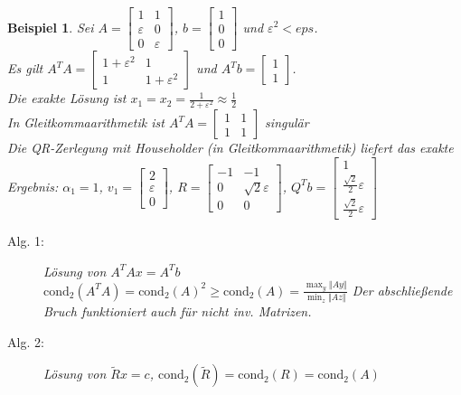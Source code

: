 \documentclass[12pt]{article}
\theoremstyle{break}
\newtheorem{example}[theorem]{Beispiel}
\begin{document}
\begin{example}
Sei $A = \left[ \begin{matrix} 1 & 1 \\ \varepsilon & 0 \\ 0 & \varepsilon \end{matrix} \right]$, $b= \left[ \begin{matrix} 1 \\ 0 \\ 0 \end{matrix} \right]$ und $\varepsilon^2 < eps$.\\
Es gilt $A^TA = \left[ \begin{matrix} 1+ \varepsilon^2 & 1 \\ 1 & 1 + \varepsilon^2 \end{matrix} \right]$ und $A^Tb = \left[ \begin{matrix} 1 \\ 1 \end{matrix} \right]$.\\
Die exakte Lösung ist $x_1 = x_2 = \frac{1}{2+\varepsilon^2} \approx \frac{1}{2}$ \\
In Gleitkommaarithmetik ist $A^TA = \left[ \begin{matrix} 1 & 1 \\ 1 & 1 \end{matrix} \right]$ singulär\\
Die QR-Zerlegung mit Householder (in Gleitkommaarithmetik) liefert das exakte Ergebnis:
$\alpha_1 = 1$, $v_1 = \left[ \begin{matrix} 2 \\ \varepsilon \\ 0 \end{matrix} \right]$, $R = \left[ \begin{matrix} -1 & -1 \\ 0 & \sqrt{2} \varepsilon \\ 0 & 0 \end{matrix} \right]$, $Q^Tb = \left[ \begin{matrix} 1 \\ \frac{\sqrt{2}}{2} \varepsilon \\ \frac{\sqrt{2}}{2} \varepsilon \end{matrix} \right]$
\begin{description}
  \item[Alg. 1:] Lösung von $A^TAx = A^Tb$ $\text{cond}_2(A^TA) = \text{cond}_2(A)^2 \geq \text{cond}_2(A) = \frac{\max_y \Vert Ay \Vert}{\min_z \Vert Az \Vert}$ Der abschließende Bruch funktioniert auch für nicht inv. Matrizen.
  
  \item[Alg. 2:] Lösung von $\tilde{R}x = c$, $\text{cond}_2(\tilde{R}) = \text{cond}_2(R) = \text{cond}_2(A)$
\end{description}
\end{example}
\end{document}

